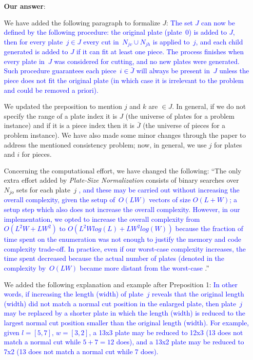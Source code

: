 \documentclass[smallextended]{svjour3}       %
\makeatletter
\newif\iffinalversion
\newcommand{\newtext}[1]{\iffinalversion%
#1%
\else%
\textcolor{blue}{#1}%
\fi%
}
\newcommand\gobblepars{%
    \@ifnextchar\par%
        {\expandafter\gobblepars\@gobble}%
        {}}
\newcounter{answer}
\newenvironment{answer}{%
    \refstepcounter{answer}\par\smallskip\noindent%
    \textbf{Our answer}: \gobblepars}%
    {\unskip\bigskip}
\makeatother
\begin{document}
\begin{answer}
We have added the following paragraph to formalize \(J\):
\newtext{The set \(J\) can now be defined by the following procedure: the original plate (plate~\(0\)) is added to \(J\), then for every plate~\(j \in J\) every cut in~\(N_{jv} \cup N_{jh}\) is applied to~\(j\), and each child generated is added to \(J\) if it can fit at least one piece. The process finishes when every plate in~\(J\) was considered for cutting, and no new plates were generated. Such procedure guarantees each piece~\(i \in \bar{J}\) will always be present in~\(J\) unless the piece does not fit the original plate (in which case it is irrelevant to the problem and could be removed a priori).}

We updated the preposition to mention \(j\) and \(k\) are \(\in J\). In general, if we do not specify the range of a plate index it is \(J\) (the universe of plates for a problem instance) and if it is a piece index then it is \(\bar{J}\) (the universe of pieces for a problem instance). We have also made some minor changes through the paper to address the mentioned consistency problem; now, in general, we use \(j\) for plates and \(i\) for pieces.

Concerning the computational effort, we have changed the following: ``The only extra effort added by \emph{Plate-Size Normalization} consists of binary searches over~\(N_{jo}\) sets for each plate~\(j\)\newtext{, and these may be carried out without increasing the overall complexity, given the setup of~\(O(LW)\) vectors of size \(O(L + W)\); a setup step which also does not increase the overall complexity. However, in our implementation, we opted to increase the overall complexity from \(O(L^2W + LW^2)\) to \(O(L^2Wlog(L) + LW^2log(W))\) because the fraction of time spent on the enumeration was not enough to justify the memory and code complexity trade-off. In practice, even if our worst-case complexity increases, the time spent decreased because the actual number of plates (denoted in the complexity by~\(O(LW)\) became more distant from the worst-case}.''

We added the following explanation and example after Preposition 1:
\newtext{In other words, if increasing the length (width) of plate~\(j\) reveals that the original length (width) did not match a normal cut position in the enlarged plate, then plate~\(j\) may be replaced by a shorter plate in which the length (width) is reduced to the largest normal cut position smaller than the original length (width). For example, given \(l = [5, 7]\), \(w = [3, 2]\), a 13x3 plate may be reduced to 12x3 (13 does not match a normal cut while \(5 + 7 = 12\) does), and a 13x2 plate may be reduced to 7x2 (13 does not match a normal cut while 7 does).}


\end{answer}
\end{document}
